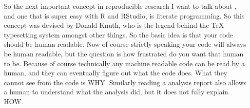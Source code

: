 \documentclass[12pt]{article}
\begin{document}
So the next important concept in reproducible research  I want to talk about , and one that is super easy with R and RStudio, is literate programming. So this concept was devised by Donald Knuth, who is the legend behind the TeX typesetting system amongst other things. So the basic idea is that your code should be human readable. Now of course strictly speaking your code will always be human readable, but the question is how frustrated do you want that human to be. Because of course technically any machine readable code can be read by a human, and they can eventually figure out what the code does. What they cannot see from the code is WHY. Similarly reading a analysis report also allows a human to understand what the analysis did, but it does not fully explain HOW. 
\end{document}
